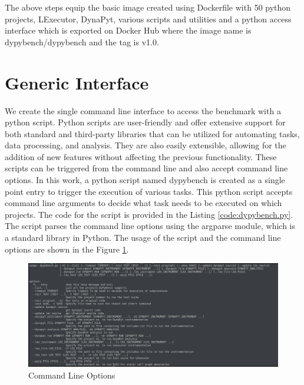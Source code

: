 The above steps equip the basic image created using Dockerfile with 50 python projects, LExecutor, DynaPyt, various scripts and utilities and a python access interface which is exported on Docker Hub where the image name is dypybench/dypybench and the tag is v1.0.

\section{Generic Interface}
We create the single command line interface to access the benchmark with a python script.
Python scripts are user-friendly and offer extensive support for both standard and third-party libraries that can be utilized for automating tasks, data processing, and analysis.
They are also easily extensible, allowing for the addition of new features without affecting the previous functionality.
These scripts can be triggered from the command line and also accept command line options.
In this work, a python script named dypybench is created as a single point entry to trigger the execution of various tasks.
This python script accepts command line arguments to decide what task needs to be executed on which projects.
The code for the script is provided in the Listing \ref{code:dypybench.py}.
The script parses the command line options using the argparse module, which is a standard library in Python.
The usage of the script and the command line options are shown in the Figure \ref{fig:command-line-options}.
\begin{figure}[ht]
    \centering
    \includegraphics[width=1\linewidth]{figures/implementation/command-line-options.png}
    \caption[Command Line Options]{\label{fig:command-line-options}Command Line Options}
\end{figure}


